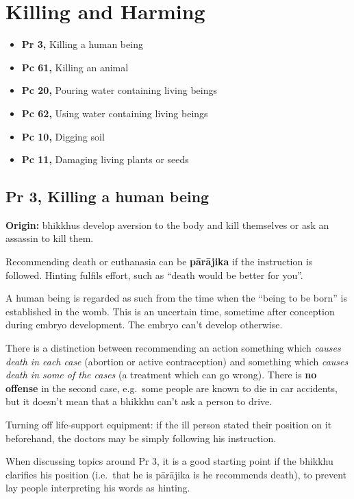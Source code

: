 \chapter{Killing and Harming}

\begin{itemize}
\tightlist
\item
  \textbf{Pr 3,} Killing a human being
\item
  \textbf{Pc 61,} Killing an animal
\item
  \textbf{Pc 20,} Pouring water containing living beings
\item
  \textbf{Pc 62,} Using water containing living beings
\item
  \textbf{Pc 10,} Digging soil
\item
  \textbf{Pc 11,} Damaging living plants or seeds
\end{itemize}

\section{Pr 3, Killing a human being}


\textbf{Origin:} bhikkhus develop aversion to the body and kill
themselves or ask an assassin to kill them.

Recommending death or euthanasia can be \textbf{pārājika} if the
instruction is followed. Hinting fulfils effort, such as ``death would
be better for you''.

A human being is regarded as such from the time when the ``being to be
born'' is established in the womb. This is an uncertain time, sometime
after conception during embryo development. The embryo can't develop
otherwise.

\enlargethispage*{\baselineskip}

There is a distinction between recommending an action something which
\emph{causes death in each case} (abortion or active contraception) and
something which \emph{causes death in some of the cases} (a treatment
which can go wrong). There is \textbf{no offense} in the second case,
e.g.~some people are known to die in car accidents, but it doesn't mean
that a bhikkhu can't ask a person to drive.

Turning off life-support equipment: if the ill person stated their
position on it beforehand, the doctors may be simply following his
instruction.

When discussing topics around Pr 3, it is a good starting point if the
bhikkhu clarifies his position (i.e.~that he is pārājika is he
recommends death), to prevent lay people interpreting his words as
hinting.

